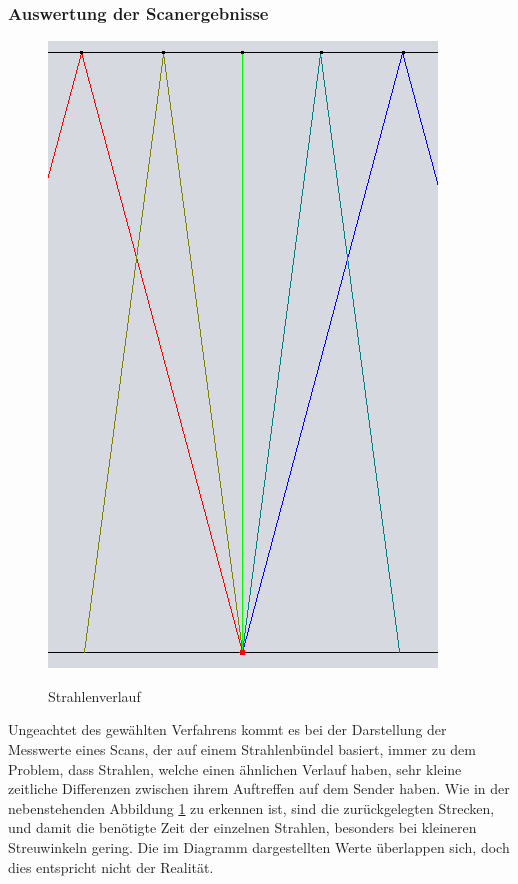 \documentclass[reducespace,stylepage,semiarbeit]{spezidoc}
\begin{document}
\newpage
\subsubsection{Auswertung der Scanergebnisse}
\begin{figure}
\includegraphics[scale=0.25]{pictures/Strahlenbuendel.png} 
\label{fig:Wegunterschied}
\caption{Strahlenverlauf}
\end{figure} 
Ungeachtet des gewählten Verfahrens kommt es bei der Darstellung der Messwerte eines Scans, der auf einem Strahlenbündel basiert, immer zu dem Problem, dass Strahlen, welche einen ähnlichen Verlauf haben, sehr kleine zeitliche Differenzen zwischen ihrem Auftreffen auf dem Sender haben. 
Wie in der nebenstehenden Abbildung \ref{fig:Wegunterschied} zu erkennen ist, sind die zurückgelegten Strecken, und damit die benötigte Zeit der einzelnen Strahlen, besonders bei kleineren Streuwinkeln gering. %
Die im Diagramm dargestellten Werte überlappen sich, doch dies entspricht nicht der Realität. 
\end{document}
